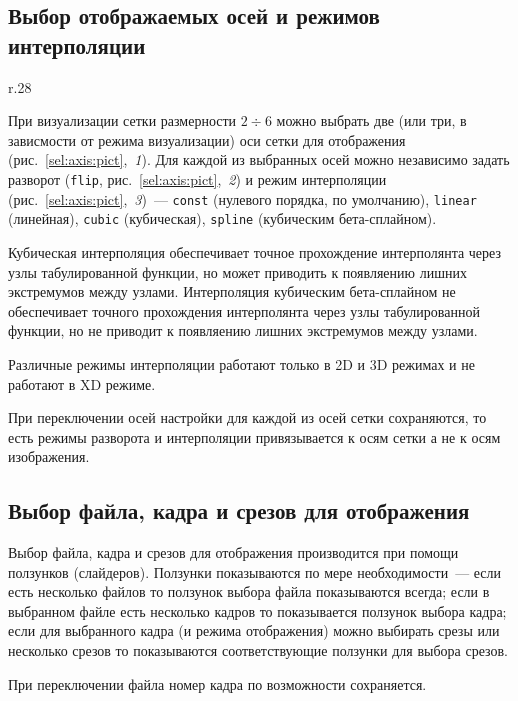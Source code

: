 \documentclass[12pt]{article}
\begin{document}

\subsection{Выбор отображаемых осей и режимов интерполяции}
\begin{wrapfigure}{r}{.28\textwidth}
  \caption{Выбор отображаемых осей и режимов интерполяции}\label{sel:axis:pict}
\end{wrapfigure}
При визуализации сетки размерности $2\div6$ можно выбрать две (или три, в зависмости от режима визуализации)
оси сетки для отображения (рис.~\ref{sel:axis:pict},~{\it 1}). Для каждой из выбранных осей можно независимо задать разворот
(\verb'flip', рис.~\ref{sel:axis:pict},~{\it 2})
и режим интерполяции (рис.~\ref{sel:axis:pict},~{\it 3})~--- \verb'const' (нулевого порядка, по умолчанию),
\verb'linear' (линейная), \verb'cubic' (кубическая), \verb'spline' (кубическим бета-сплайном). 

Кубическая интерполяция обеспечивает точное прохождение интерполянта через узлы табулированной функции, но может приводить к появляению лишних экстремумов между узлами.
Интерполяция кубическим бета-сплайном не обеспечивает точного прохождения интерполянта через узлы табулированной функции,
но не приводит к появляению лишних экстремумов между узлами.

Различные режимы интерполяции работают только в 2D и 3D режимах и не работают в XD режиме.

При переключении осей настройки для каждой из осей сетки сохраняются, то есть режимы разворота и интерполяции привязывается к осям сетки а не к осям изображения.

\subsection{Выбор файла, кадра и срезов для отображения}
Выбор файла, кадра и срезов для отображения производится при помощи ползунков (слайдеров).
Ползунки показываются по мере необходимости~--- если есть несколько файлов то ползунок выбора файла показываются всегда;
если в выбранном файле есть несколько кадров то показывается ползунок выбора кадра;
если для выбранного кадра (и режима отображения) можно выбирать срезы или несколько срезов то показываются
соответствующие ползунки для выбора срезов.

При переключении файла номер кадра по возможности сохраняется.
\end{document}
